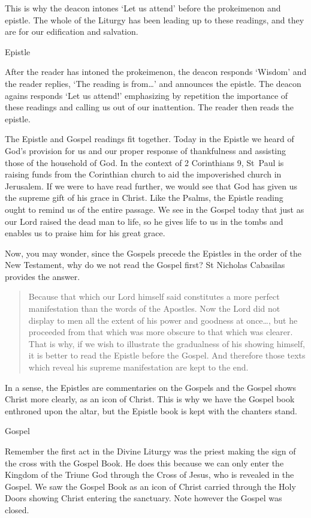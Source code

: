 \documentclass[
]{article}
\begin{document}
This is why the deacon intones `Let us attend' before the prokeimenon
and epistle. The whole of the Liturgy has been leading up to these
readings, and they are for our edification and salvation.

Epistle

After the reader has intoned the prokeimenon, the deacon responds
`Wisdom' and the reader replies, `The reading is from\ldots{}' and
announces the epistle. The deacon agains responds `Let us attend!'
emphasizing by repetition the importance of these readings and calling
us out of our inattention. The reader then reads the epistle.

The Epistle and Gospel readings fit together. Today in the Epistle we
heard of God's provision for us and our proper response of thankfulness
and assisting those of the household of God. In the context of 2
Corinthians 9, St~Paul is raising funds from the Corinthian church to
aid the impoverished church in Jerusalem. If we were to have read
further, we would see that God has given us the supreme gift of his
grace in Christ. Like the Psalms, the Epistle reading ought to remind us
of the entire passage. We see in the Gospel today that just as our Lord
raised the dead man to life, so he gives life to us in the tombs and
enables us to praise him for his great grace.

Now, you may wonder, since the Gospels precede the Epistles in the order
of the New Testament, why do we not read the Gospel first? St Nicholas
Cabasilas provides the answer.

\begin{quote}
Because that which our Lord himself said constitutes a more perfect
manifestation than the words of the Apostles. Now the Lord did not
display to men all the extent of his power and goodness at once\ldots,
but he proceeded from that which was more obscure to that which was
clearer. That is why, if we wish to illustrate the gradualness of his
showing himself, it is better to read the Epistle before the Gospel. And
therefore those texts which reveal his supreme manifestation are kept to
the end.
\end{quote}

In a sense, the Epistles are commentaries on the Gospels and the Gospel
shows Christ more clearly, as an icon of Christ. This is why we have the
Gospel book enthroned upon the altar, but the Epistle book is kept with
the chanters stand.

Gospel

Remember the first act in the Divine Liturgy was the priest making the
sign of the cross with the Gospel Book. He does this because we can only
enter the Kingdom of the Triune God through the Cross of Jesus, who is
revealed in the Gospel. We saw the Gospel Book as an icon of Christ
carried through the Holy Doors showing Christ entering the sanctuary.
Note however the Gospel was closed.
\end{document}
